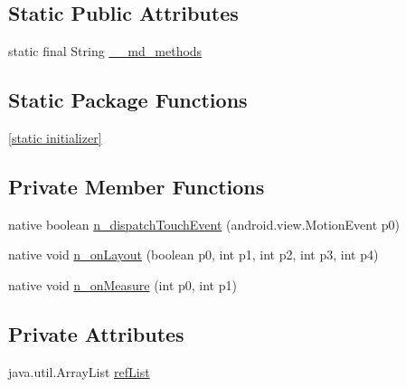 \subsection*{Static Public Attributes}
\begin{CompactItemize}
\item 
static final String \hyperlink{classmd5b60ffeb829f638581ab2bb9b1a7f4f3f_1_1_platform_renderer_b4ebc79b3f389fb8fc2cf5953db2bf42}{\_\-\_\-md\_\-methods}
\end{CompactItemize}
\subsection*{Static Package Functions}
\begin{CompactItemize}
\item 
\hyperlink{classmd5b60ffeb829f638581ab2bb9b1a7f4f3f_1_1_platform_renderer_19ebdb3686aa5e257fb7c4abf069ba7f}{\mbox{[}static initializer\mbox{]}}
\end{CompactItemize}
\subsection*{Private Member Functions}
\begin{CompactItemize}
\item 
native boolean \hyperlink{classmd5b60ffeb829f638581ab2bb9b1a7f4f3f_1_1_platform_renderer_33089c37f5c6ec94de8506358b5cd98b}{n\_\-dispatchTouchEvent} (android.view.MotionEvent p0)
\item 
native void \hyperlink{classmd5b60ffeb829f638581ab2bb9b1a7f4f3f_1_1_platform_renderer_e7e16c9b10a5745eb0b67775d46a9f2b}{n\_\-onLayout} (boolean p0, int p1, int p2, int p3, int p4)
\item 
native void \hyperlink{classmd5b60ffeb829f638581ab2bb9b1a7f4f3f_1_1_platform_renderer_05c8d5168fd42d9017bd758865451741}{n\_\-onMeasure} (int p0, int p1)
\end{CompactItemize}
\subsection*{Private Attributes}
\begin{CompactItemize}
\item 
java.util.ArrayList \hyperlink{classmd5b60ffeb829f638581ab2bb9b1a7f4f3f_1_1_platform_renderer_d7349c32d4b68a5a1ca844cd7439dcaa}{refList}
\end{CompactItemize}


